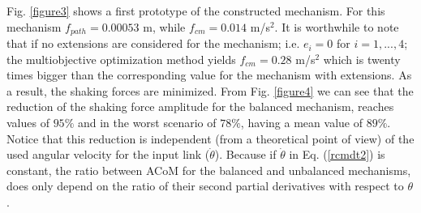 \documentclass[11pt]{article}
\begin{document}
Fig. \ref{figure3} shows a first prototype of the constructed 
mechanism. For this mechanism  $f_{path}=0.00053$ m, while 
$f_{cm}=0.014$ m/s$^2$. It is worthwhile to note that if no extensions 
are considered for the mechanism; i.e. $e_i=0$ for $i=1,...,4$; the 
multiobjective optimization method yields $f_{cm}=0.28$  m/s$^2$ which 
is twenty times bigger than the corresponding value for
the mechanism with extensions. As a result, the shaking forces are 
minimized. From Fig. \ref{figure4} we can see that the reduction of the 
shaking force amplitude for the balanced mechanism, reaches values 
of $ 95\%$ and in the worst scenario of $ 78\%$, having a mean value of 
$89\%$.  Notice that this reduction is 
independent (from a theoretical point of view) of the used angular 
velocity for the input link ($\dot{\theta}$). Because if $\dot{\theta}$ 
in Eq. (\ref{rcmdt2}) is constant, the ratio between ACoM for the balanced 
and unbalanced mechanisms, does only depend on the ratio of
their second partial derivatives with respect to $\theta$. 
\end{document}
